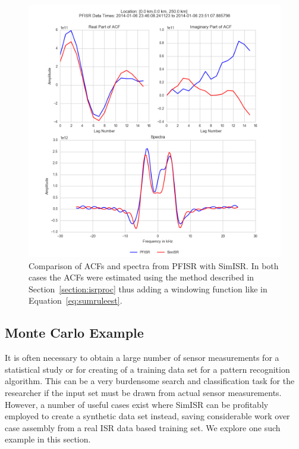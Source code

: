 \begin{figure}[h!]
\centering
\includegraphics[width=4.5in]{speccomp}
\caption{Comparison of ACFs and spectra from PFISR with SimISR. In both cases the ACFs were estimated using the method described in Section~\ref{section:isrproc} thus adding a windowing function like in Equation~\ref{eq:sumruleest}.}
\label{fig:simisrspectcom}
\end{figure}


\subsection{Monte Carlo Example}

It is often necessary to obtain a large number of sensor measurements for a statistical study or for creating of a training data set for a pattern recognition algorithm. This can be a very burdensome search and classification task for the researcher if the input set must be drawn from actual sensor measurements. However, a number of useful cases exist where SimISR can be profitably employed to create a synthetic data set instead, saving considerable work over case assembly from a real ISR data based training set.  We explore one such example in this section.

